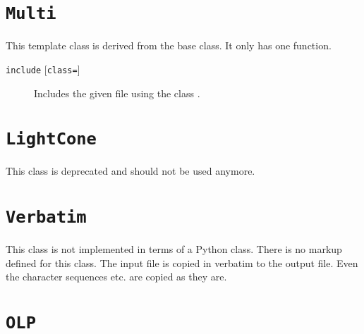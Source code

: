 \documentclass[11pt,a4paper]{refrep}
\begin{document}
\section{\texttt{Multi}}
This template class is derived from the base class. It only
has one function.
\begin{description}
\item[\texttt{include}  {[\texttt{class=}]}]
   Includes the given file using the class .
\end{description}
\section{\texttt{LightCone}}
This class is deprecated and should not be used anymore.

\section{\texttt{Verbatim}}
This class is not implemented in terms of a Python class. There is
no markup defined for this class. The input file is copied in
verbatim to the output file. Even the character sequences
\lit{[\%} etc. are copied as they are.

\section{\texttt{OLP}}
\end{document}
